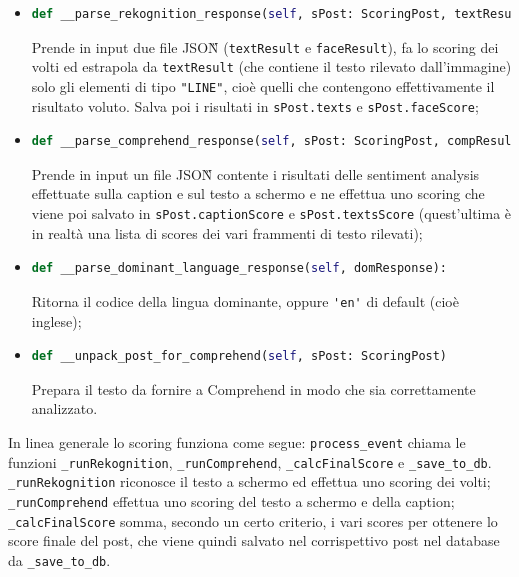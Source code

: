 \begin{itemize}
\item 
\begin{lstlisting}[language=Python, numbers=none]
def __parse_rekognition_response(self, sPost: ScoringPost, textResult, faceResult):
\end{lstlisting}
Prende in input due file JSON\G{} (\verb+textResult+ e \verb+faceResult+), fa lo scoring dei volti 
ed estrapola 
da \verb+textResult+ (che contiene il testo rilevato dall'immagine) solo gli elementi 
di tipo \verb+"LINE"+, 
cioè quelli che contengono effettivamente il risultato voluto.
Salva poi i risultati in \verb+sPost.texts+ e \verb+sPost.faceScore+;

\item 
\begin{lstlisting}[language=Python, numbers=none]
def __parse_comprehend_response(self, sPost: ScoringPost, compResult):
\end{lstlisting}
Prende in input un file JSON\G{} contente i risultati delle sentiment analysis effettuate 
sulla caption e sul testo a schermo e ne effettua uno scoring che viene poi salvato 
in \verb+sPost.captionScore+ e \verb+sPost.textsScore+ (quest'ultima è in realtà una lista 
di scores dei vari frammenti di testo rilevati);

\item 
\begin{lstlisting}[language=Python, numbers=none]
def __parse_dominant_language_response(self, domResponse):
\end{lstlisting}
Ritorna il codice della lingua dominante, oppure \verb+'en'+ di default (cioè inglese);

\item 
\begin{lstlisting}[language=Python, numbers=none]
def __unpack_post_for_comprehend(self, sPost: ScoringPost)
\end{lstlisting}
Prepara il testo da fornire a Comprehend in modo che sia correttamente analizzato.
\end{itemize}
In linea generale lo scoring funziona come segue:
\verb+process_event+ chiama le funzioni \verb+_runRekognition+, \verb+_runComprehend+,
\verb+_calcFinalScore+ e \verb+_save_to_db+.\\
\verb+_runRekognition+ riconosce il testo a schermo ed effettua uno scoring dei volti;\\
\verb+_runComprehend+ effettua uno scoring del testo a schermo e della caption;\\
\verb+_calcFinalScore+ somma, secondo un certo criterio, i vari scores per ottenere lo score
finale del post, che viene quindi salvato nel corrispettivo post nel database da \verb+_save_to_db+.
\newpage
